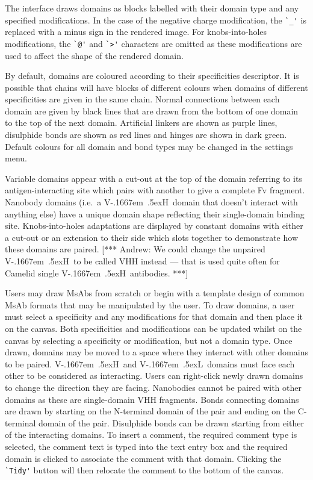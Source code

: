 \documentclass[a4]{article}
\newcommand{\VH}{\mbox{V\kern-.1667em \lower.5ex\hbox{\scriptsize H}}}
\newcommand{\VL}{\mbox{V\kern-.1667em \lower.5ex\hbox{\scriptsize L}}}
\newcommand{\andrew}[1]{{\color{red} [*** Andrew: #1 ***]}}
\begin{document}
The interface draws domains as blocks labelled with their domain type
and any specified modifications.  In the case of the negative charge
modification, the \verb|`_'| is replaced with a minus sign in the
rendered image.  For knobs-into-holes modifications, the \verb|`@'|
and \verb|`>'| characters are omitted as these modifications are used
to affect the shape of the rendered domain.

By default, domains are coloured according
to their specificities descriptor. It is possible that chains will
have blocks of different colours when domains of different
specificities are given in the same chain.
Normal connections between each domain are given by black lines that
are drawn from the bottom of one domain to the top of the next
domain. Artificial linkers are shown as purple lines, disulphide bonds
are shown as red lines and hinges are shown in dark green. Default
colours for all domain and bond types 
may be changed in the settings menu.


Variable domains appear
with a cut-out at the top of the domain referring to its
antigen-interacting site which pairs with another to give a complete
Fv fragment. Nanobody domains (i.e.\ a \VH\ domain that doesn't interact with
anything else) have a unique domain shape reflecting their single-domain
binding site. Knobs-into-holes adaptations are displayed by constant
domains with either a cut-out or an extension to their side which
slots together to demonstrate how these domains are paired.
\andrew{We could change the unpaired \VH\ to be called VHH instead ---
  that is used quite often for Camelid single \VH\ antibodies.}

Users may draw MsAbs from scratch or begin with a template design of
common MsAb formats that may be manipulated by the user. To draw
domains, a user must select a specificity and any modifications for that domain
and then place it on the canvas. Both specificities and modifications
can be updated whilst on the canvas by selecting a specificity or
modification, but not a domain type. Once drawn, domains may be
moved to a space where they interact with other domains to be
paired. \VH\ and \VL\ domains must face each other to be considered as
interacting. Users can right-click newly drawn domains to change the
direction they are facing. Nanobodies cannot be paired with other
domains as these are single-domain VHH fragments. Bonds connecting
domains are drawn by starting on the N-terminal domain of the pair and ending on
the C-terminal domain of the pair. Disulphide bonds can be drawn starting from either
of the interacting domains. To insert a comment, the required
comment type is selected, the comment text is typed into the
text entry box and the required domain is clicked to associate the
comment with that domain.  Clicking the \verb|`Tidy'| button will then
relocate the comment to the bottom of the canvas.
\end{document}
